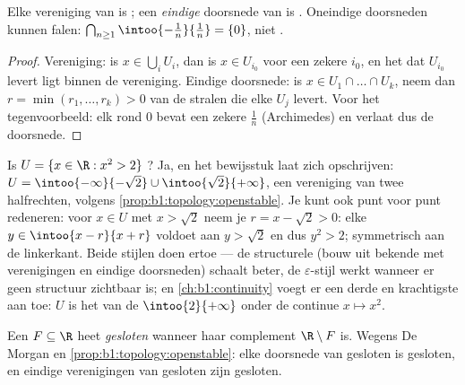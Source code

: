 \begin{proposition}\label{prop:b1:topology:openstable}
Elke vereniging van  is ; een \emph{eindige}
doorsnede van  is . Oneindige doorsneden kunnen
falen: $\bigcap_{n \geq 1} \intoo{-\frac 1n}{\frac 1n} = \{0\}$, niet
.
\end{proposition}

\begin{proof}
Vereniging: is $x \in \bigcup_i U_i$, dan is $x \in U_{i_0}$ voor een
zekere $i_0$, en het  dat $U_{i_0}$ levert ligt binnen de
vereniging. Eindige doorsnede: is $x \in U_1 \cap \dots \cap U_k$, neem
dan $r = \min(r_1, \dots, r_k) > 0$ van de stralen die elke $U_j$ levert.
Voor het tegenvoorbeeld: elk  rond $0$ bevat een zekere
$\frac{1}{n}$ (Archimedes) en verlaat dus de doorsnede.
\end{proof}

\begin{example}\label{ex:b1:topology:radii}
Is $U = \{x \in \R : x^2 > 2\}$ ? Ja, en het bewijsstuk laat zich
opschrijven: $U = \intoo{-\infty}{-\sqrt2} \cup \intoo{\sqrt2}{+\infty}$,
een vereniging van twee  halfrechten,  volgens
\cref{prop:b1:topology:openstable}. Je kunt ook punt voor punt
redeneren: voor $x \in U$ met $x > \sqrt 2$ neem je $r = x - \sqrt2 > 0$:
elke $y \in \intoo{x - r}{x + r}$ voldoet aan $y > \sqrt 2$ en dus $y^2 >
2$; symmetrisch aan de linkerkant. Beide stijlen doen ertoe --- de
structurele (bouw uit bekende  met verenigingen en
eindige doorsneden) schaalt beter, de $\varepsilon$-stijl werkt wanneer
er geen structuur zichtbaar is; en \cref{ch:b1:continuity} voegt er een
derde en krachtigste aan toe: $U$ is het  van de  $\intoo{2}{+\infty}$ onder de continue $x \mapsto x^2$.
\end{example}

\begin{definition}\label{def:b1:topology:closed}
Een  $F \subseteq \R$ heet
\emph{gesloten} wanneer haar complement $\R
\setminus F$  is. Wegens De Morgan en
\cref{prop:b1:topology:openstable}: elke doorsnede van gesloten
 is gesloten, en eindige verenigingen van gesloten
 zijn gesloten.
\end{definition}

